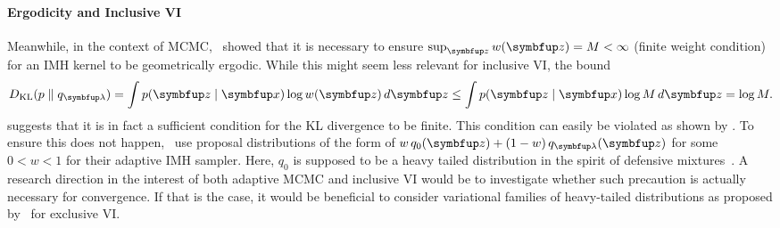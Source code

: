 \vspace{-0.1in}
\paragraph{Ergodicity and Inclusive VI}
Meanwhile, in the context of MCMC,~\citet{10.2307/2242610} showed that it is necessary to ensure \(\sup_{\vz} w(\vz) = M < \infty\) (finite weight condition) for an IMH kernel to be geometrically ergodic.
While this might seem less relevant for inclusive VI, the bound
%
\vspace{-0.02in}
\begin{align}
  \DKL{p}{q_{\vlambda}} = \int p(\vz\mid\vx) \log w(\vz)\,d\vz \leq \int p(\vz\mid\vx) \log M \, d\vz = \log M.
\end{align}
\vspace{-0.02in}
%
suggests that it is in fact a sufficient condition for the KL divergence to be finite.
This condition can easily be violated as shown by \citet{10.1007/s11222-008-9110-y}.
To ensure this does not happen,~\citet{giordani_adaptive_2010, holden_adaptive_2009} use proposal distributions of the form of \(w\,q_0(\vz) + (1-w)\,q_{\vlambda}(\vz)\) for some \(0<w<1\) for their adaptive IMH sampler.
Here, \(q_0\) is supposed to be a heavy tailed distribution in the spirit of defensive mixtures~\citep{hesterberg_weighted_1995}.
A research direction in the interest of both adaptive MCMC and inclusive VI would be to investigate whether such precaution is actually necessary for convergence.
If that is the case, it would be beneficial to consider variational families of heavy-tailed distributions as proposed by~\citet{NEURIPS2018_25db67c5} for exclusive VI.


